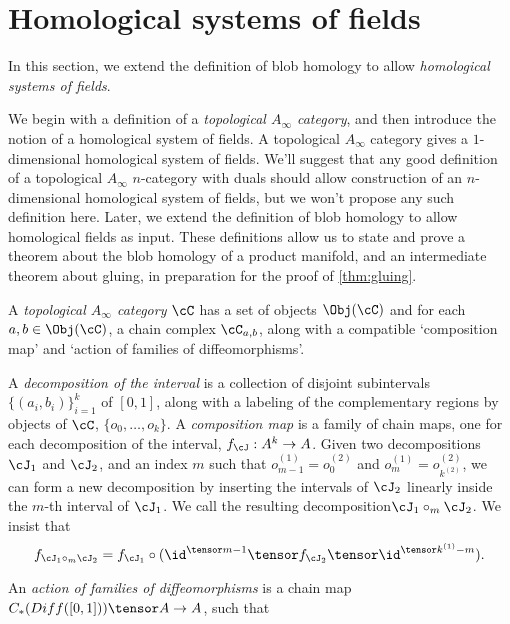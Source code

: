 \section{Homological systems of fields}

In this section, we extend the definition of blob homology to allow \emph{homological systems of fields}.

We begin with a definition of a \emph{topological $A_\infty$ category}, and then introduce the notion of a homological system of fields. A topological $A_\infty$ category gives a $1$-dimensional homological system of fields. We'll suggest that any good definition of a topological $A_\infty$ $n$-category with duals should allow construction of an $n$-dimensional homological system of fields, but we won't propose any such definition here. Later, we extend the definition of blob homology to allow homological fields as input. These definitions allow us to state and prove a theorem about the blob homology of a product manifold, and an intermediate theorem about gluing, in preparation for the proof of \ref{thm:gluing}.

\begin{defn}
A \emph{topological $A_\infty$ category $\cC$} has a set of objects $\Obj(\cC)$ and for each $a,b \in \Obj(\cC)$, a chain complex $\cC_{a,b}$, along with a compatible `composition map' and `action of families of diffeomorphisms'.

A \emph{decomposition of the interval} is a collection of disjoint subintervals $\{(a_i,b_i)\}_{i=1}^k$ of $[0,1]$, along with a labeling of the complementary regions by objects of $\cC$, $\{o_0, \ldots, o_k\}$. A \emph{composition map} is a family of chain maps, one for each decomposition of the interval, $f_\cJ : A^k \to A$. Given two decompositions $\cJ_1$ and $\cJ_2$, and an index $m$ such that $o^{(1)}_{m-1} = o^{(2)}_0$ and $o^{(1)}_{m} = o^{(2)}_{k^{(2)}}$, we can form a new decomposition by inserting the intervals of $\cJ_2$ linearly inside the $m$-th interval of $\cJ_1$. We call the resulting decomposition$\cJ_1 \circ_m \cJ_2$. We insist that
\begin{equation*}
f_{\cJ_1 \circ_m \cJ_2} = f_{\cJ_1} \circ (\id^{\tensor m-1} \tensor f_{\cJ_2} \tensor \id^{\tensor k^{(1)} - m}).
\end{equation*}

An \emph{action of families of diffeomorphisms} is a chain map $C_*(Diff([0,1])) \tensor A \to A$, such that  
\end{defn}

